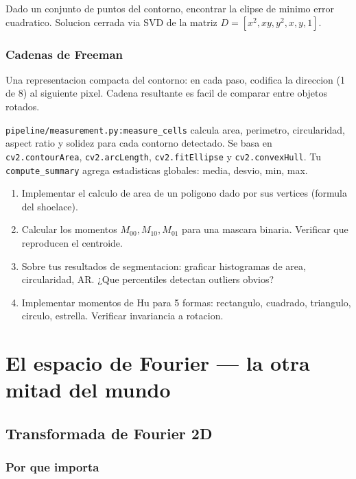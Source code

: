 \documentclass[11pt,a4paper,twoside,openright]{book}
\begin{document}
Dado un conjunto de puntos del contorno, encontrar la elipse de minimo error cuadratico. Solucion cerrada via SVD de la matriz $D = [x^2, xy, y^2, x, y, 1]$.

\section{Cadenas de Freeman}

Una representacion compacta del contorno: en cada paso, codifica la direccion (1 de 8) al siguiente pixel. Cadena resultante es facil de comparar entre objetos rotados.

\begin{pipeline}
\texttt{pipeline/measurement.py:measure\_cells} calcula area, perimetro, circularidad, aspect ratio y solidez para cada contorno detectado. Se basa en \texttt{cv2.contourArea}, \texttt{cv2.arcLength}, \texttt{cv2.fitEllipse} y \texttt{cv2.convexHull}. Tu \texttt{compute\_summary} agrega estadisticas globales: media, desvio, min, max.
\end{pipeline}

\begin{ejercicio}
\begin{enumerate}[leftmargin=2em]
  \item Implementar el calculo de area de un poligono dado por sus vertices (formula del shoelace).
  \item Calcular los momentos $M_{00}, M_{10}, M_{01}$ para una mascara binaria. Verificar que reproducen el centroide.
  \item Sobre tus resultados de segmentacion: graficar histogramas de area, circularidad, AR. ¿Que percentiles detectan outliers obvios?
  \item Implementar momentos de Hu para 5 formas: rectangulo, cuadrado, triangulo, circulo, estrella. Verificar invariancia a rotacion.
\end{enumerate}
\end{ejercicio}

\part{El espacio de Fourier --- la otra mitad del mundo}

\chapter{Transformada de Fourier 2D}
\label{ch:fourier}

\section{Por que importa}
\end{document}
